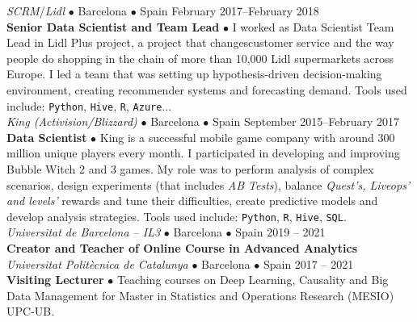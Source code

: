 \documentclass[a4paper, oneside]{scrreprt}
\begin{document}
\vspace{-0.3cm}
\noindent{}\textit{SCRM}/\textit{Lidl} $\bullet$ 
Barcelona $\bullet$ Spain \hfill February 2017--February 2018\\
\noindent\textbf{\small Senior Data Scientist and Team Lead} $\bullet$ 
{\small I worked as Data Scientist Team Lead in Lidl Plus project, a project that changescustomer
  service and the way people do shopping in the chain of more than 10,000 Lidl supermarkets across
  Europe. I led a team that was setting up hypothesis-driven decision-making environment, creating
  recommender systems and forecasting demand. Tools used include: \texttt{Python}, \texttt{Hive},
  \texttt{R}, \texttt{Azure}...}\\

\vspace{-0.3cm}
\noindent{}
\hspace{-0.15cm}\textit{King (Activision/Blizzard)} $\bullet$ 
Barcelona $\bullet$ Spain \hfill September 2015--February 2017\\
\noindent\textbf{\small Data Scientist } $\bullet$ 
{\small King is a successful mobile game company with around 300 million unique players every month. I participated in developing and
  improving Bubble Witch 2 and 3 games. My
  role was to perform analysis of complex scenarios,
  design experiments (that includes \textit{AB Tests}),
  balance \textit{Quest's, Liveops' and levels'}
  rewards and tune their difficulties,
  create predictive models and develop analysis strategies.
  Tools used include: \texttt{Python}, \texttt{R}, \texttt{Hive}, \texttt{SQL}. }\\

\vspace{-0.3cm}
\noindent{}\textit{Universitat de Barcelona -- IL3} $\bullet$ 
Barcelona $\bullet$ Spain \hfill 2019 -- 2021\\
\noindent\textbf{\small Creator and Teacher of Online Course in Advanced Analytics} \\

\vspace{-0.3cm}
\noindent{}\textit{Universitat Politècnica de Catalunya} $\bullet$ 
Barcelona $\bullet$ Spain \hfill 2017 -- 2021\\
\noindent\textbf{\small Visiting Lecturer} $\bullet$ Teaching courses on Deep Learning, Causality and
Big Data Management for Master in Statistics and Operations Research (MESIO) UPC-UB. \\
\end{document}
